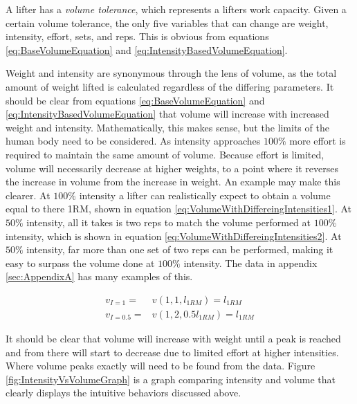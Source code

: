 A lifter has a \textit{volume tolerance}, which represents a lifters work capacity. Given a certain volume tolerance, the only five variables that can change are weight, intensity, effort, sets, and reps. This is obvious from equations \ref{eq:BaseVolumeEquation} and \ref{eq:IntensityBasedVolumeEquation}.

Weight and intensity are synonymous through the lens of volume, as the total amount of weight lifted is calculated regardless of the differing parameters. It should be clear from equations \ref{eq:BaseVolumeEquation} and \ref{eq:IntensityBasedVolumeEquation} that volume will increase with increased weight and intensity. Mathematically, this makes sense, but the limits of the human body need to be considered. As intensity approaches $100\%$ more effort is required to maintain the same amount of volume. Because effort is limited, volume will necessarily decrease at higher weights, to a point where it reverses the increase in volume from the increase in weight. An example may make this clearer. At $100\%$ intensity a lifter can realistically expect to obtain a volume equal to there 1RM, shown in equation \ref{eq:VolumeWithDiffereingIntensities1}. At $50\%$ intensity, all it takes is two reps to match the volume performed at $100\%$ intensity, which is shown in equation \ref{eq:VolumeWithDiffereingIntensities2}. At $50\%$ intensity, far more than one set of two reps can be performed, making it easy to surpass the volume done at $100\%$ intensity. The data in appendix \ref{sec:AppendixA} has many examples of this.

\begin{subequations}
    \begin{align}
        \label{eq:VolumeWithDiffereingIntensities1}
        v_{I=1}=&v(1,1,l_{1RM})=l_{1RM} \\
        \label{eq:VolumeWithDiffereingIntensities2}
        v_{I=0.5}=&v(1,2,0.5l_{1RM})=l_{1RM}
    \end{align}
\end{subequations}

It should be clear that volume will increase with weight until a peak is reached and from there will start to decrease due to limited effort at higher intensities. Where volume peaks exactly will need to be found from the data. Figure \ref{fig:IntensityVsVolumeGraph} is a graph comparing intensity and volume that clearly displays the intuitive behaviors discussed above.


